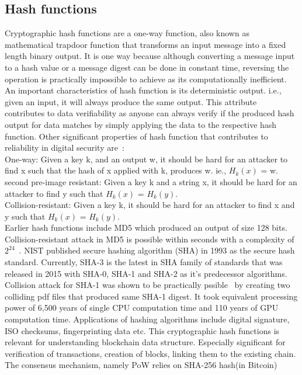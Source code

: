 \subsection{Hash functions}
Cryptographic hash functions are a one-way function, also known as mathematical
trapdoor function that transforms an input message into a fixed length binary
output. It is one way because although converting a message input to a hash
value or a message digest can be done in constant time, reversing the operation
is practically impossible to achieve as its computationally inefficient. An
important characteristics of hash function is its deterministic output. i.e.,
given an input, it will always produce the same output. This attribute
contributes to data verifiability as anyone can always verify if the produced
hash output for data matches by simply applying the data to the respective hash
function. 
Other significant properties of hash function that contributes to
reliability in digital security are~\cite{mironov2005hash}: \\
One-way: Given a key k, and an output w, it should be hard for an attacker to find x
such that the hash of x applied with k, produces w. ie., $H_k(x)$ = w.\\ 
second pre-image resistant: Given a key k and a string x, it should be hard for
an attacker to find y such that $H_k(x)$ = $H_k(y)$.\\ 
Collision-resistant: Given a key k, it should be hard for an attacker to find x and y such that
$H_k(x)$ = $H_k(y)$. \\
Earlier hash functions include MD5 which produced an output of size 128 bits.
Collision-resistant attack in MD5 is possible within seconds with a complexity
of $2^{24}$~\cite{wang2005break}. NIST published secure hashing algorithm (SHA)
in 1993 as the secure hash standard. Currently, SHA-3 is the latest in SHA
family of standards that was released in 2015 with SHA-0, SHA-1 and SHA-2 as
it's predecessor algorithms. Collision attack for SHA-1 was shown to be
practically pssible~\cite{stevens2017first} by creating two colliding pdf files
that produced same SHA-1 digest. It took equivalent processing power of 6,500
years of single CPU computation time and 110 years of GPU computation time.
Applications of hashing algorithms include digital signature, ISO checksums,
fingerprinting data etc. This cryptographic hash functions is relevant for
understanding blockchain data structure. Especially significant for
verification of transactions, creation of blocks, linking them to the existing
chain. The consensus mechanism, namely PoW relies on SHA-256 hash(in Bitcoin)
